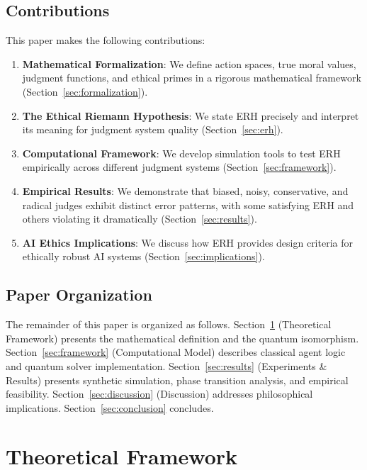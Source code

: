 \documentclass[12pt,a4paper]{article}
\theoremstyle{definition}
\theoremstyle{remark}
\begin{document}
\subsection{Contributions}

This paper makes the following contributions:

\begin{enumerate}
    \item \textbf{Mathematical Formalization}: We define action spaces, true moral values, judgment functions, and ethical primes in a rigorous mathematical framework (Section~\ref{sec:formalization}).
    
    \item \textbf{The Ethical Riemann Hypothesis}: We state ERH precisely and interpret its meaning for judgment system quality (Section~\ref{sec:erh}).
    
    \item \textbf{Computational Framework}: We develop simulation tools to test ERH empirically across different judgment systems (Section~\ref{sec:framework}).
    
    \item \textbf{Empirical Results}: We demonstrate that biased, noisy, conservative, and radical judges exhibit distinct error patterns, with some satisfying ERH and others violating it dramatically (Section~\ref{sec:results}).
    
    \item \textbf{AI Ethics Implications}: We discuss how ERH provides design criteria for ethically robust AI systems (Section~\ref{sec:implications}).
\end{enumerate}

\subsection{Paper Organization}

The remainder of this paper is organized as follows. Section~\ref{sec:theoretical} (Theoretical Framework) presents the mathematical definition and the quantum isomorphism. Section~\ref{sec:framework} (Computational Model) describes classical agent logic and quantum solver implementation. Section~\ref{sec:results} (Experiments \& Results) presents synthetic simulation, phase transition analysis, and empirical feasibility. Section~\ref{sec:discussion} (Discussion) addresses philosophical implications. Section~\ref{sec:conclusion} concludes.

\section{Theoretical Framework}
\label{sec:theoretical}
\end{document}
